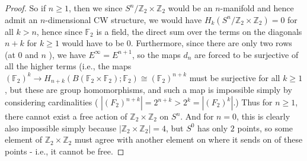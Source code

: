 \documentclass[reqno]{amsart}
\theoremstyle{definition}
\theoremstyle{remark}
\begin{document}
\begin{proof}
So if $n\ge 1$, then
we since $S^{n} / \mathbb{Z}_2 \times \mathbb{Z}_2$ would
be an  $n$-manifold and hence admit an
$n$-dimensional CW structure, we would have
$H_k \left( S^{n} / \mathbb{Z}_2 \times \mathbb{Z}_2 \right) 
=0$ for all $k>n$, hence since $\mathbb{F}_2$ is a field,
the direct sum over the terms on the diagonals
$n+k$ for $k\ge 1$ would have to be $0$.
Furthermore, since there are only two rows (at
$0$ and $n$ ), we have
$E^{\infty} = E^{n+1}$, so the maps
$d_n$ are forced to be surjective of all
the higher terms (i.e., the maps
$\left( \mathbb{F}_2 \right)^{k}
\to H_{n+k}\left( 
B\left( \mathbb{F}_2 \times \mathbb{F}_2 \right) ; \mathbb{F}_2
\right) \cong
\left( \mathbb{F}_2 \right)^{n+k}$ must be surjective
for all $k\ge 1$, but these are group homomorphisms,
and such a map is impossible simply by considering
cardinalities (
$\left| \left( F_2 \right)^{n+k} \right| 
= 2^{n+k} > 2^{k} = \left| \left( F_2 \right)^{k} \right| $.)
Thus for $n\ge 1$, there cannot exist a free
action of $\mathbb{Z}_2 \times \mathbb{Z}_2$ on
$S^{n}$. And
for $n=0$, this is clearly also impossible
simply because
$\left| \mathbb{Z}_2 \times \mathbb{Z}_2 \right| 
= 4$, but $S^{0}$ has only $2$ points, so
some element
of $\mathbb{Z}_2 \times \mathbb{Z}_2$ must agree
with another element on where it sends on of these points - i.e.,
it cannot be free.





    \end{proof}








\end{document}
